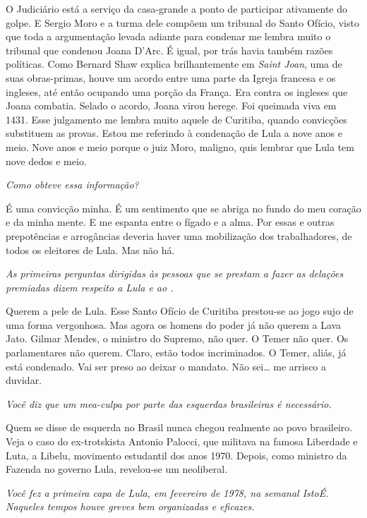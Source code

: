 \normalfont
O Judiciário está a serviço da casa-grande a ponto de
participar ativamente do golpe. E Sergio Moro e a turma dele compõem um
tribunal do Santo Ofício, visto que toda a argumentação levada adiante
para condenar me lembra muito o tribunal que condenou Joana D'Arc. É
igual, por trás havia também razões políticas. Como Bernard Shaw explica
brilhantemente em \emph{Saint Joan}, uma de suas obras-primas, houve um
acordo entre uma parte da Igreja francesa e os ingleses, até então
ocupando uma porção da França. Era contra os ingleses que Joana
combatia. Selado o acordo, Joana virou herege. Foi queimada viva em
1431. Esse julgamento me lembra muito aquele de Curitiba, quando
convicções substituem as provas. Estou me referindo à condenação de Lula
a nove anos e meio. Nove anos e meio porque o juiz Moro, maligno, quis
lembrar que Lula tem nove dedos e meio.

\itshape
 Como obteve essa informação?

\normalfont
É uma convicção minha. É um sentimento que se abriga no
fundo do meu coração e da minha mente. E me espanta entre o fígado e a
alma. Por essas e outras prepotências e arrogâncias deveria haver uma
mobilização dos trabalhadores, de todos os eleitores de Lula. Mas não
há.

\itshape
 As primeiras perguntas dirigidas às pessoas que se
prestam a fazer as delações premiadas dizem respeito a Lula e ao .

\normalfont
Querem a pele de Lula. Esse Santo Ofício de Curitiba
prestou-se ao jogo sujo de uma forma vergonhosa. Mas agora os homens do
poder já não querem a Lava Jato. Gilmar Mendes, o ministro do Supremo,
não quer. O Temer não quer. Os parlamentares não querem. Claro, estão
todos incriminados. O Temer, aliás, já está condenado. Vai ser preso ao
deixar o mandato. Não sei\ldots{} me arrisco a duvidar.

\itshape
 Você diz que um \emph{mea-culpa} por parte das
esquerdas brasileiras é necessário.

\normalfont
Quem se disse de esquerda no Brasil nunca chegou
realmente ao povo brasileiro. Veja o caso do ex-trotskista Antonio
Palocci, que militava na famosa Liberdade e Luta, a Libelu, movimento
estudantil dos anos 1970. Depois, como ministro da Fazenda no governo
Lula, revelou-se um neoliberal.

\itshape
 Você fez a primeira capa de Lula, em fevereiro de 1978,
na semanal \emph{IstoÉ}. Naqueles tempos houve greves bem organizadas e
eficazes.

